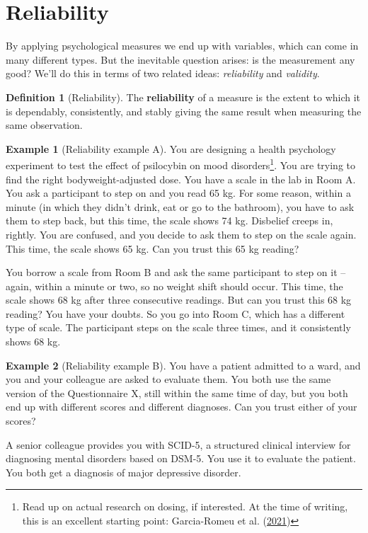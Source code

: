 \documentclass[
  11pt,
]{book}
\theoremstyle{definition}
\newtheorem{definition}{Definition}[chapter]
\theoremstyle{definition}
\newtheorem{example}{Example}[chapter]
\theoremstyle{definition}
\theoremstyle{definition}
\theoremstyle{remark}
\begin{document}
\hypertarget{reliability}{%
\section{Reliability}\label{reliability}}

By applying psychological measures we end up with variables, which can come in many different types. But the inevitable question arises: is the measurement any good? We'll do this in terms of two related ideas: \emph{reliability} and \emph{validity}.

\begin{definition}[Reliability]
\protect\hypertarget{def:defreliability}{}\label{def:defreliability}The \textbf{reliability} of a measure is the extent to which it is dependably, consistently, and stably giving the same result when measuring the same observation.
\end{definition}

\begin{example}[Reliability example A]
\protect\hypertarget{exm:exreliability1}{}\label{exm:exreliability1}You are designing a health psychology experiment to test the effect of psilocybin on mood disorders\footnote{Read up on actual research on dosing, if interested. At the time of writing, this is an excellent starting point: Garcia-Romeu et al. (\protect\hyperlink{ref-garcia-romeuOptimalDosingPsilocybin2021}{2021})}. You are trying to find the right bodyweight-adjusted dose. You have a scale in the lab in Room A. You ask a participant to step on and you read 65 kg. For some reason, within a minute (in which they didn't drink, eat or go to the bathroom), you have to ask them to step back, but this time, the scale shows 74 kg. Disbelief creeps in, rightly. You are confused, and you decide to ask them to step on the scale again. This time, the scale shows 65 kg. Can you trust this 65 kg reading?

You borrow a scale from Room B and ask the same participant to step on it -- again, within a minute or two, so no weight shift should occur. This time, the scale shows 68 kg after three consecutive readings. But can you trust this 68 kg reading? You have your doubts. So you go into Room C, which has a different type of scale. The participant steps on the scale three times, and it consistently shows 68 kg.
\end{example}

\begin{example}[Reliability example B]
\protect\hypertarget{exm:exreliability2}{}\label{exm:exreliability2}You have a patient admitted to a ward, and you and your colleague are asked to evaluate them. You both use the same version of the Questionnaire X, still within the same time of day, but you both end up with different scores and different diagnoses. Can you trust either of your scores?

A senior colleague provides you with SCID-5, a structured clinical interview for diagnosing mental disorders based on DSM-5. You use it to evaluate the patient. You both get a diagnosis of major depressive disorder.
\end{example}
\end{document}
